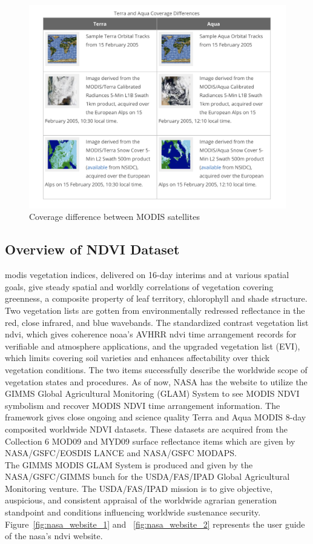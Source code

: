     \begin{figure}[H]
            \centering
            \includegraphics[width=1.0\linewidth]{figures/ch3/satellites.png}
            \caption{\label{fig:modis_satellites_difference} Coverage difference between MODIS satellites \cite{NSIDC}}
    \end{figure}

\subsection{Overview of NDVI Dataset}

\gls{modis} vegetation indices, delivered on 16-day interims and at various spatial goals, give steady spatial and worldly correlations of vegetation covering greenness, a composite property of leaf territory, chlorophyll and shade structure. Two vegetation lists are gotten from environmentally redressed reflectance in the red, close infrared, and blue wavebands. The standardized contrast vegetation list \gls{ndvi}, which gives coherence \gls{noaa}'s AVHRR \gls{ndvi} time arrangement records for verifiable and atmosphere applications, and the upgraded vegetation list (EVI), which limits covering soil varieties and enhances affectability over thick vegetation conditions. The two items successfully describe the worldwide scope of vegetation states and procedures. As of now, NASA has the website to utilize the GIMMS Global Agricultural Monitoring (GLAM) System to see MODIS NDVI symbolism and recover MODIS NDVI time arrangement information. The framework gives close ongoing and science quality Terra and Aqua MODIS 8-day composited worldwide NDVI datasets. These datasets are acquired from the Collection 6 MOD09 and MYD09 surface reflectance items which are given by NASA/GSFC/EOSDIS LANCE and NASA/GSFC MODAPS. \\
The GIMMS MODIS GLAM System is produced and given by the NASA/GSFC/GIMMS bunch for the USDA/FAS/IPAD Global Agricultural Monitoring venture. The USDA/FAS/IPAD mission is to give objective, auspicious, and consistent appraisal of the worldwide agrarian generation standpoint and conditions influencing worldwide sustenance security. Figure~\ref{fig:nasa_website_1} and ~\ref{fig:nasa_website_2} represents the user guide of the \gls{nasa}'s \gls{ndvi} website.

